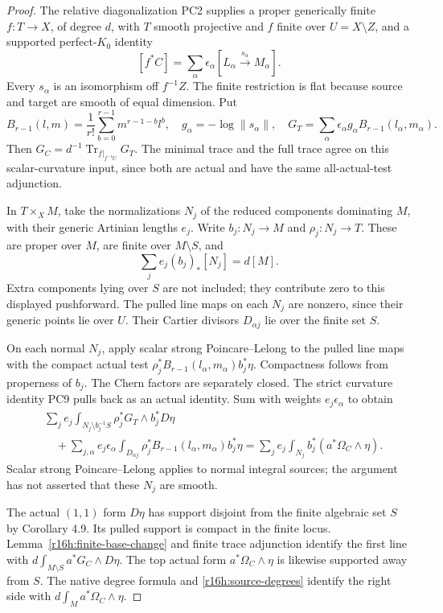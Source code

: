 \documentclass[11pt,a4paper]{article}
\theoremstyle{definition}
\theoremstyle{remark}
\numberwithin{equation}{section}
\begin{document}
\begin{proof}
The relative diagonalization PC2 supplies a proper generically finite
$f:T\to X$, of degree $d$, with $T$ smooth projective and $f$ finite
over $U=X\setminus Z$, and a supported perfect-$K_0$ identity
\[
 [f^*C]=\sum_\alpha\epsilon_\alpha[L_\alpha\xrightarrow{s_\alpha}M_\alpha].
\]
Every $s_\alpha$ is an isomorphism off $f^{-1}Z$. The finite restriction
is flat because source and target are smooth of equal dimension. Put
\[
 B_{r-1}(l,m)=\frac1{r!}\sum_{b=0}^{r-1}m^{r-1-b}l^b,
 \quad g_\alpha=-\log\|s_\alpha\|,\quad
 G_T=\sum_\alpha\epsilon_\alpha g_\alpha B_{r-1}(l_\alpha,m_\alpha).
\]
Then $G_C=d^{-1}\operatorname{Tr}_{f|_{f^{-1}U}}G_T$. The minimal
trace and the full trace agree on this scalar-curvature input, since
both are actual and have the same all-actual-test adjunction.

In $T\times_X M$, take the normalizations $N_j$ of the reduced
components dominating $M$, with their generic Artinian lengths $e_j$.
Write $b_j:N_j\to M$ and $\rho_j:N_j\to T$. These are proper over
$M$, are finite over $M\setminus S$, and
\[
                  \sum_j e_j(b_j)_*[N_j]=d[M].
 \tag{H16.5}\label{r16h:source-degrees}
\]
Extra components lying over $S$ are not included; they contribute zero
to this displayed pushforward. The pulled line maps on each $N_j$ are
nonzero, since their generic points lie over $U$. Their Cartier
divisors $D_{\alpha j}$ lie over the finite set $S$.

On each normal $N_j$, apply scalar strong Poincare--Lelong to the
pulled line maps with the compact actual test
$\rho_j^*B_{r-1}(l_\alpha,m_\alpha)b_j^*\eta$. Compactness follows
from properness of $b_j$. The Chern factors are separately closed.
The strict curvature identity PC9 pulls back as an actual identity.
Sum with weights $e_j\epsilon_\alpha$ to obtain
\begin{align*}
 &\sum_j e_j\int_{N_j\setminus b_j^{-1}S}
                    \rho_j^*G_T\wedge b_j^*D\eta\\
 &\quad+\sum_{j,\alpha}e_j\epsilon_\alpha
       \int_{D_{\alpha j}}\rho_j^*B_{r-1}(l_\alpha,m_\alpha)b_j^*\eta
       =\sum_j e_j\int_{N_j}b_j^*(a^*\Omega_C\wedge\eta).
 \tag{H16.6}\label{r16h:upstairs-slice}
\end{align*}
Scalar strong Poincare--Lelong applies to normal integral sources; the
argument has not asserted that these $N_j$ are smooth.

The actual $(1,1)$ form $D\eta$ has support disjoint from the finite
algebraic set $S$ by Corollary 4.9. Its pulled support is compact in
the finite locus. Lemma~\ref{r16h:finite-base-change} and finite trace
adjunction identify the first line with
$d\int_{M\setminus S}a^*G_C\wedge D\eta$.
The top actual form $a^*\Omega_C\wedge\eta$ is likewise supported
away from $S$. The native degree formula and
\eqref{r16h:source-degrees} identify the right side with
$d\int_Ma^*\Omega_C\wedge\eta$.


\end{proof}
\end{document}

